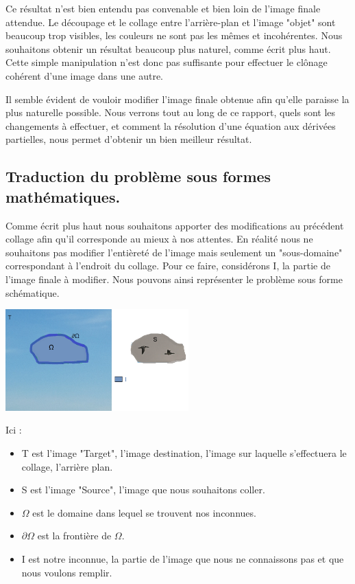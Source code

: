 Ce résultat n'est bien entendu pas convenable et bien loin de l'image finale attendue. Le découpage et le collage entre l'arrière-plan et l'image "objet" sont beaucoup trop visibles, les couleurs ne sont pas les mêmes et incohérentes. Nous souhaitons obtenir un résultat beaucoup plus naturel, comme écrit plus haut. Cette simple manipulation n'est donc pas suffisante pour effectuer le clônage cohérent  d'une image dans une autre. \newline

Il semble évident de vouloir modifier l'image finale obtenue afin qu'elle paraisse la plus naturelle possible. Nous verrons tout au long de ce rapport, quels sont les changements à effectuer, et comment la résolution d'une équation aux dérivées partielles, nous permet d'obtenir un bien meilleur résultat. 


\subsection{Traduction du problème sous formes mathématiques.}

Comme écrit plus haut nous souhaitons apporter des modifications au précédent collage afin qu'il corresponde au mieux à nos attentes. En réalité nous ne souhaitons pas modifier l'entièreté de l'image mais seulement un "sous-domaine" correspondant à l'endroit du collage. Pour ce faire, considérons I, la partie de l'image finale à modifier. Nous pouvons ainsi représenter le problème sous forme schématique. 
\begin{center}
    \includegraphics[width = 200pt]{Images/Schee.jpg}
\end{center}

Ici : 
\begin{itemize}
    \item T est l'image "Target", l'image destination, l'image sur laquelle s'effectuera le collage, l'arrière plan. 
    \item S est l'image "Source", l'image que nous souhaitons coller.
    \item $\Omega$ est le domaine dans lequel se trouvent nos inconnues.
    \item $\partial \Omega$ est la frontière de $\Omega$.
    \item I est notre inconnue, la partie de l'image que nous ne connaissons pas et que nous voulons remplir.
\end{itemize}

